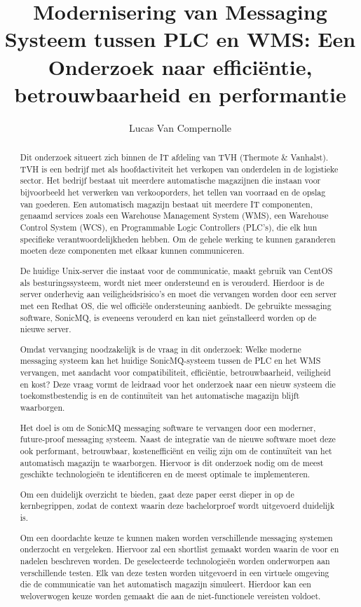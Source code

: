 \documentclass{hogent-article}
\title{Modernisering van Messaging Systeem tussen PLC en WMS: Een Onderzoek naar efficiëntie, betrouwbaarheid en performantie}
\author{Lucas Van Compernolle}
\begin{document}
\begin{abstract}

Dit onderzoek situeert zich binnen de IT afdeling van TVH (Thermote \& Vanhalst). 
TVH is een bedrijf met als hoofdactiviteit het verkopen van onderdelen in de logistieke sector.
Het bedrijf bestaat uit meerdere automatische magazijnen die instaan voor bijvoorbeeld het verwerken van verkooporders, 
het tellen van voorraad en de opslag van goederen. 
Een automatisch magazijn bestaat uit meerdere IT componenten, genaamd services zoals
een Warehouse Management System (WMS), een Warehouse Control System (WCS), en Programmable Logic Controllers (PLC's), die elk hun specifieke verantwoordelijkheden hebben. 
Om de gehele werking te kunnen garanderen moeten deze componenten met elkaar kunnen communiceren. 
\newline

De huidige Unix-server die instaat voor de communicatie, maakt gebruik van CentOS als besturingssysteem,
wordt niet meer ondersteund en is verouderd.
Hierdoor is de server onderhevig aan veiligheidsrisico's en moet die vervangen worden door een server met een Redhat OS, die wel officiële ondersteuning aanbiedt.
De gebruikte messaging software, SonicMQ, is eveneens verouderd en kan niet geïnstalleerd worden op de nieuwe server. 

Omdat vervanging noodzakelijk is de vraag in dit onderzoek: 
Welke moderne messaging systeem kan het huidige SonicMQ-systeem tussen de PLC en het WMS vervangen, 
met aandacht voor compatibiliteit, efficiëntie, betrouwbaarheid, veiligheid en kost?
Deze vraag vormt de leidraad voor het onderzoek naar een nieuw systeem die toekomstbestendig is 
en de continuïteit van het automatische magazijn blijft waarborgen.
\newline

Het doel is om de SonicMQ messaging software te vervangen door een moderner, future-proof messaging systeem.
Naast de integratie van de nieuwe software moet deze ook performant, betrouwbaar, kostenefficiënt en veilig zijn 
om de continuïteit van het automatisch magazijn te waarborgen. 
Hiervoor is dit onderzoek nodig om de meest geschikte technologieën te identificeren en de meest optimale te implementeren.
\newline

Om een duidelijk overzicht te bieden, gaat deze paper eerst dieper in op de kernbegrippen, 
zodat de context waarin deze bachelorproef wordt uitgevoerd duidelijk is.

Om een doordachte keuze te kunnen maken worden verschillende messaging systemen onderzocht en vergeleken. 
Hiervoor zal een shortlist gemaakt worden waarin de voor en nadelen beschreven worden.
De geselecteerde technologieën worden onderworpen aan verschillende testen.
Elk van deze testen worden uitgevoerd in een virtuele omgeving die de communicatie van het automatisch magazijn simuleert. 
Hierdoor kan een weloverwogen keuze worden gemaakt die aan de niet-functionele vereisten voldoet.

\end{abstract}

\tableofcontents




\printbibliography[heading=bibintoc]
\end{document}
